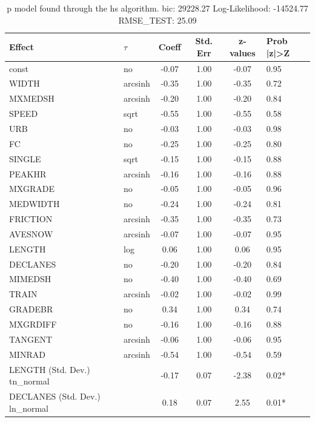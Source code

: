 \begin{table}
	\caption{p model found through the hs algorithm. bic: 29228.27 Log-Likelihood: -14524.77 RMSE_TEST: 25.09}
	\begin{center}
		\begin{tabular}{|l|l|c|c|c|l|}
			\hline
			Effect & $\tau$ & Coeff & Std. Err & z-values & Prob |z|>Z \\
			\hline
			const & no & -0.07 & 1.00 & -0.07 & 0.95 \\
			\hline
			WIDTH & arcsinh & -0.35 & 1.00 & -0.35 & 0.72 \\
			\hline
			MXMEDSH & arcsinh & -0.20 & 1.00 & -0.20 & 0.84 \\
			\hline
			SPEED & sqrt & -0.55 & 1.00 & -0.55 & 0.58 \\
			\hline
			URB & no & -0.03 & 1.00 & -0.03 & 0.98 \\
			\hline
			FC & no & -0.25 & 1.00 & -0.25 & 0.80 \\
			\hline
			SINGLE & sqrt & -0.15 & 1.00 & -0.15 & 0.88 \\
			\hline
			PEAKHR & arcsinh & -0.16 & 1.00 & -0.16 & 0.88 \\
			\hline
			MXGRADE & no & -0.05 & 1.00 & -0.05 & 0.96 \\
			\hline
			MEDWIDTH & no & -0.24 & 1.00 & -0.24 & 0.81 \\
			\hline
			FRICTION & arcsinh & -0.35 & 1.00 & -0.35 & 0.73 \\
			\hline
			AVESNOW & arcsinh & -0.07 & 1.00 & -0.07 & 0.95 \\
			\hline
			LENGTH & log & 0.06 & 1.00 & 0.06 & 0.95 \\
			\hline
			DECLANES & no & -0.20 & 1.00 & -0.20 & 0.84 \\
			\hline
			MIMEDSH & no & -0.40 & 1.00 & -0.40 & 0.69 \\
			\hline
			TRAIN & arcsinh & -0.02 & 1.00 & -0.02 & 0.99 \\
			\hline
			GRADEBR & no & 0.34 & 1.00 & 0.34 & 0.74 \\
			\hline
			MXGRDIFF & no & -0.16 & 1.00 & -0.16 & 0.88 \\
			\hline
			TANGENT & arcsinh & -0.06 & 1.00 & -0.06 & 0.95 \\
			\hline
			MINRAD & arcsinh & -0.54 & 1.00 & -0.54 & 0.59 \\
			\hline
			LENGTH (Std. Dev.) tn_normal &  & -0.17 & 0.07 & -2.38 & 0.02* \\
			\hline
			DECLANES (Std. Dev.) ln_normal &  & 0.18 & 0.07 & 2.55 & 0.01* \\

\end{tabular}
\end{center}
\end{table}
